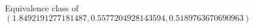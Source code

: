 \documentclass[preview]{standalone}
\begin{document}
\begin{center}
Equivalence class of $(1.8492191277181487, 0.5577204928143594, 0.5189763670690963)$
\end{center}
\end{document}
